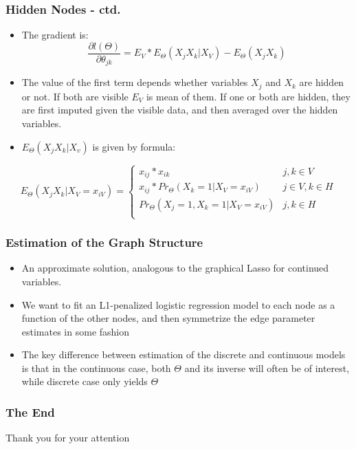 \documentclass{beamer}
\begin{document}
\begin{frame}
\frametitle{ Hidden Nodes - ctd.}
\begin{itemize}
\item The gradient is:
\begin{equation}
\frac{\partial l(\Theta)}{\partial \theta_{jk}} = E_{V} * E_{\Theta}(X_jX_k|X_V) -  E_{\Theta}(X_jX_k)
\end{equation}
\item The value of the first term depends whether variables $X_j$ and $X_k$ are hidden or not. If both are visible $E_V$ is mean of them. If one or both are hidden, they are first imputed given the visible data, and then averaged over the hidden variables.
\item $E_{\Theta}(X_jX_k | X_v)$ is given by formula:
\end{itemize}
\[E_{\Theta}(X_jX_k | X_V = x_{iV}) = \begin{cases}
    x_{ij}*x_{ik}       & j, k \in V\\
     x_{ij}*Pr_{\Theta}(X_k = 1 | X_V = x_{iV})       & j \in V, k \in H\\
     Pr_{\Theta}(X_j = 1, X_k = 1 | X_V = x_{iV})       & j, k \in H\\
\end{cases} 
\]
\end{frame}

\begin{frame}
\frametitle{ Estimation of the Graph Structure }
\begin{itemize}
\item{An approximate solution, analogous to the graphical Lasso for continued variables.}
\item{We want to fit an L1-penalized logistic regression model to each node as a function of the other nodes, and then symmetrize the edge parameter estimates in some fashion}
\item{The key difference between estimation of the discrete and continuous models is that in the continuous case, both $\Theta$ and its inverse will often be of interest, while discrete case only yields $\Theta$}
\end{itemize}
\end{frame}

\begin{frame}
\frametitle{The End}
Thank you for your attention
\end{frame}
\end{document}
